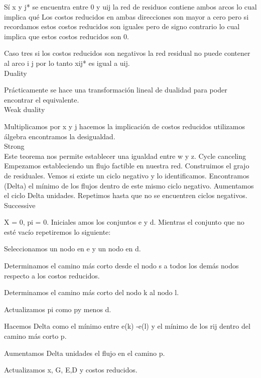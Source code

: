 \documentclass[12 pt]{report}
\begin{document}
Sí x y j* se encuentra entre 0 y uij la red de residuos contiene ambos arcos lo cual implica qué Los costos reducidos en ambas direcciones son mayor a cero pero si recordamos estos costos reducidos son iguales pero de signo contrario lo cual implica que estos costos reducidos son 0.

Caso  tres si los costos reducidos son negativos la red residual no puede contener al arco i j por lo tanto xij* es igual a uij.\\
Duality

Prácticamente se hace una transformación lineal de dualidad para poder encontrar el equivalente.\\
Weak duality

Multiplicamos por x y j hacemos la implicación de costos reducidos utilizamos álgebra encontramos la desigualdad.\\
Strong\\
Este teorema nos permite establecer una igualdad entre w y z.
Cycle canceling
Empezamos estableciendo un flujo factible en nuestra red.
Construimos el grajo de residuales.
Vemos si existe un ciclo negativo y lo identificamos.
Encontramos (Delta) el mínimo de los flujos dentro de este mismo ciclo negativo.
Aumentamos el ciclo Delta unidades.
Repetimos hasta que no se encuentren ciclos negativos.\\
Successive

X = 0, pi = 0.
Iniciales amos los conjuntos e y d.
Mientras el conjunto que no esté vacío repetiremos lo siguiente:

Seleccionamos un nodo en e y un nodo en d.

Determinamos el camino más corto desde el nodo s a 
todos los demás nodos respecto a los costos reducidos.

Determinamos el camino más corto del nodo k al nodo l.

Actualizamos pi como py  menos d.

Hacemos Delta como el mínimo entre e(k) -e(l)  y el mínimo de los rij dentro del camino más corto p.

Aumentamos Delta unidades el flujo en el camino p.

Actualizamos x, G, E,D y costos reducidos.
\end{document}
